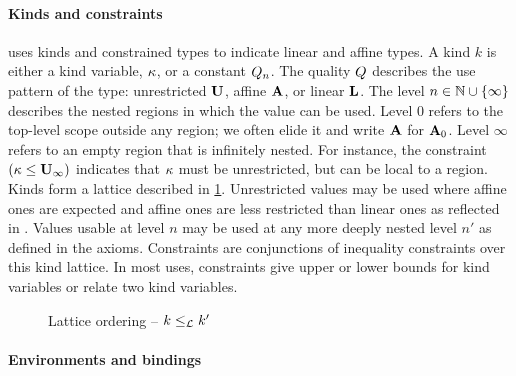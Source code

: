 \paragraph{Kinds and constraints}

\affe uses kinds and constrained types to indicate
linear and affine types.
A kind $k$ is either a kind variable, $\kappa$, or a constant $Q_n$.
The quality $Q$ describes the use pattern of the type:
unrestricted $\mathbf{U}$, affine $\mathbf{A}$, or linear $\mathbf{L}$. The level $n \in \mathbb{N} \cup \{\infty\}$
describes the nested regions in which the value can be used.
Level $0$ refers to the top-level scope outside any region; we often elide it
and write $\mathbf{A}$ for $\mathbf{A}_0$. Level
$\infty$ refers to an empty region that is infinitely nested.
For instance, the constraint $(\kappa \leq \mathbf{U}_\infty)$ indicates that
$\kappa$ must be unrestricted, but can be local to a region.
%
Kinds form a lattice described in \cref{sdtyp:lattice}.
Unrestricted values may be used
where affine ones are expected and affine ones are less restricted
than linear ones as reflected in .
Values usable at level $n$ may be used at any more deeply
nested level $n'$ as defined in the  axioms.
%
Constraints are conjunctions of inequality constraints over this kind
lattice. In most uses, constraints give upper or lower bounds for
kind variables or relate two kind variables.

\begin{figure}[tp]
  
  \vspace{-10pt}
  \caption{Lattice ordering -- $k \leq_\mathcal L k'$}
  \label{sdtyp:lattice}
  \vspace{-10pt}
\end{figure}

\paragraph{Environments and bindings}
\label{sdtyping:envs}

